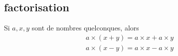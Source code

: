 \subsection{factorisation}

Si \( a,x,y\) sont de nombres quelconques, alors
\begin{subequations}
    \begin{align}
        a\times (x+y)=a\times x+a\times y\\
        a\times (x-y)=a\times x-a\times y\\
    \end{align}
\end{subequations}
